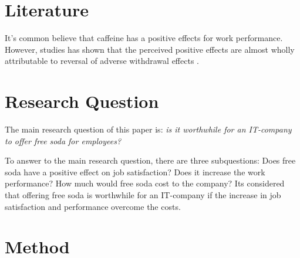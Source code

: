 \documentclass[a4paper]{article}
\begin{document}
\section{Literature}

\begin{comment}
What has been done related to this (mainly in academic publications)? 
What do the authors say about the topic? 
How does your research question relate to these previous studies? 
How do you apply them or add to them? Based on what they say, what do you say?  
\end{comment}

It's common believe that caffeine has a positive effects for work performance. However, studies has shown that the perceived positive effects are almost wholly attributable to reversal of adverse withdrawal effects \citep{james2005}.



\section{Research Question}

The main research question of this paper is: \textit{is it worthwhile for an IT-company to offer free soda for employees?} 

To answer to the main research question, there are three subquestions: Does free soda have a positive effect on job satisfaction? Does it increase the work performance? How much would free soda cost to the company? Its considered that offering free soda is worthwhile for an IT-company if the increase in job satisfaction and performance overcome the costs.

\begin{comment}
Based on what other people have studied before, what is the question that no one has really answered yet? 
What is the main question, and what are perhaps the two or three sub-questions that you need to answer to be able to answer the main question? 
Be sure of what you write, because you will have to answer to this question ☺
\end{comment}

\section{Method}

\begin{comment}
How do you find an answer to the research question? 
How do you gather data? 
From where do you gather data? 
How do you analyze the data? 
Out of all the methods in the world, why did you choose this one? 
What is good about it and what is not? 
What were the alternative methods, and what were their pros and cons? 
\end{comment}
\end{document}
